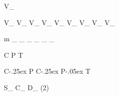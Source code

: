 
\newmathsymbol{\SigEff}{\varepsilon_{\Sig}}
\newmathsymbol{\BkgEff}{\varepsilon_{\Bkg}}


\newmathsymbol{\VCKM}             {V_{}}

\newmathsymbol{\Vud}              {V_{\uquark\dquark}}
\newmathsymbol{\Vcd}              {V_{\cquark\dquark}}
\newmathsymbol{\Vtd}              {V_{\tquark\dquark}}
\newmathsymbol{\Vus}              {V_{\uquark\squark}}
\newmathsymbol{\Vcs}              {V_{\cquark\squark}}
\newmathsymbol{\Vts}              {V_{\tquark\squark}}
\newmathsymbol{\Vub}              {V_{\uquark\bquark}}
\newmathsymbol{\Vcb}              {V_{\cquark\bquark}}
\newmathsymbol{\Vtb}              {V_{\tquark\bquark}}

\newmathsymbol{\DM}       {\Delta m}
\newmathsymbol{\DMs}      {\DM_{\squark}}
\newmathsymbol{\DMd}      {\DM_{\dquark}}
\newmathsymbol{\DG}       {\Delta\Gamma}
\newmathsymbol{\DGs}      {\DG_{\squark}}
\newmathsymbol{\DGd}      {\DG_{\dquark}}
\newmathsymbol{\Gs}       {\Gamma_{\squark}}
\newmathsymbol{\Gd}       {\Gamma_{\dquark}}


\newmathsymbol{\CSym}               {C}
\newmathsymbol{\PSym}               {P}
\newmathsymbol{\TSym}               {T}

\newmathsymbol{\CP}               {C\kern-.25ex P}
\newmathsymbol{\CPHyperref}       {\texorpdfstring{\CP}{CP}}
\newmathsymbol{\CPbfsf}           {\mathbfsfit{\CP}}
\newmathsymbol{\CPbfsfHyperref}   {\texorpdfstring{\CPbfsf}{CP}}
\newmathsymbol{\CPT}              {C\kern-.25ex P\kern-.05ex T}
\newmathsymbol{\CPAsymmetry}      {\Asym{\CP}{}}

\newmathsymbol{\SJpsiKS}      {S_{\jpsi\KS}}
\newmathsymbol{\CJpsiKS}      {C_{\jpsi\KS}}
\newmathsymbol{\DJpsiKS}      {D_{\jpsi\KS}}
\newmathsymbol{\sintwobeta}   {\sin(2\beta)}

